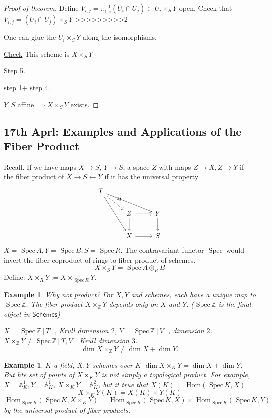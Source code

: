 \documentclass[11pt]{article}
\newtheorem{ex}[thm]{Example}
\renewcommand{\hom}{\text{ Hom}}
\newcommand{\spec}{\text{ Spec}\,}
\newcommand{\affn}{\mathbb A}
\newcommand{\intg}{\mathbb Z}
\newcommand{\Lrta}{\Longrightarrow}
\newcommand{\lrta}{\longrightarrow}
\begin{document}
\begin{proof}[Proof of theorem]
Define $V_{i,j}=\pi_{1,i}^{-1}(U_i\cap U_j)\subset U_i\times_S Y$ open. Check that $V_{i,j}=(U_i\cap U_j)\times_S Y$
>>>>>>>>>2

One can glue  the $U_i\times_S Y$ along the isomorphisms. 

\underline{Check} This scheme is $X\times_S Y$

\underline{Step 5.}

step 1+ step 4.

$Y,S$ affine $\Lrta X\times_S Y$ exists.
\end{proof}

\subsection{17th Aprl: Examples and Applications of the Fiber Product}
Recall.
If we have maps
 $X\lrta S$, $Y\lrta S$, a space $Z$ with maps $Z\lrta X, Z\lrta Y$ if the fiber product of $X\lrta S\longleftarrow Y$ if it has the universal property
 $$
\begin{tikzcd}
T \arrow[rdd] \arrow[rrd] \arrow[rd, "\exists!", dashed] &  &  \\
 & Z \arrow[d] \arrow[r] & Y \arrow[d] \\
 & X \arrow[r] & S
\end{tikzcd}
 $$
 $X=\spec A, Y=\spec B, S=\spec R$. The contravariant functor $\spec$ would invert the fiber coproduct of rings to fiber product of schemes.
 $$
X\times_S Y=\spec A\otimes_R B
 $$
 Define: $X\times_R Y:=X\times_{\spec R} Y$.

\begin{ex}
Why not product?
For $X,Y$ and schemes, each have a unique map to $\spec \intg$. The fiber product $X\times_\intg Y$ depends only on $X$ and $Y$. ($\spec \intg$ is the final object in $\mathsf{Schemes}$)

$X=\spec \intg[T]$, Krull dimension $2$, $Y=\spec \intg[V]$, dimension $2$. $X\times_\intg Y\neq\spec \intg[T,V]$ Krull dimension $3$.
$$
\dim X\times_\intg Y\neq \dim X+\dim Y.
$$
\end{ex}

\begin{ex}
$K$ a field, $X, Y$ schemes over $K$ $\dim X\times_K Y=\dim X+\dim Y$. But hte set of points of $X\times_K Y$ is not simply a topological product. For example, $X=\affn^1_K, Y=\affn^1_K$, $X\times_K Y=\affn^2_K$, but it true that $X(K)=\hom(\spec K, X)$
$$
X\times_K Y(K)=X(K)\times Y(K)
$$
$$
\hom_{\spec K}(\spec K, X\times_K Y)=\hom_{\spec K}(\spec K, X)\times \hom_{\spec K}(\spec K, Y)
$$
by the universal product of fiber products.
\end{ex}
\end{document}
